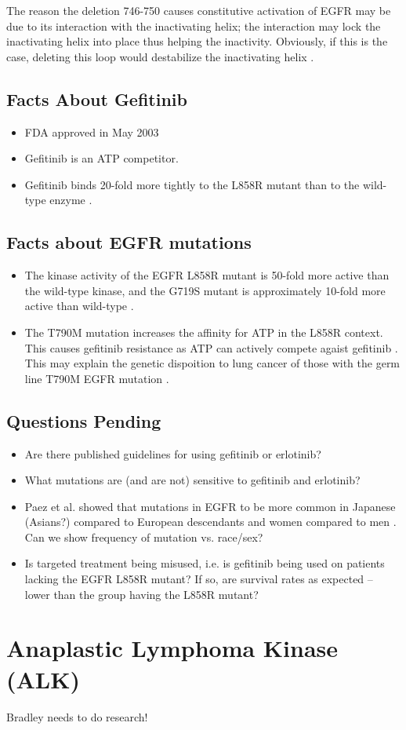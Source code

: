 \documentclass[12pt]{article}
\begin{document}
The reason the deletion 746-750 causes constitutive activation of EGFR may be due to its interaction with the inactivating helix; the interaction may lock the inactivating helix into place thus helping the inactivity. Obviously, if this is the case, deleting this loop would destabilize the inactivating helix  \cite{Zhang2006}.

\subsection*{Facts About Gefitinib}
\begin{itemize}
  \item FDA approved in May 2003
  \item Gefitinib is an ATP competitor. 
  \item Gefitinib binds 20-fold more tightly to the L858R mutant than to the wild-type enzyme \cite{Yun2007}.
\end{itemize}

\subsection*{Facts about EGFR mutations}
\begin{itemize}
  \item The kinase activity of the EGFR L858R mutant is 50-fold more active than the wild-type kinase, and the G719S mutant is approximately 10-fold more active than wild-type \cite{Yun2007}.
  \item The T790M mutation increases the affinity for ATP in the L858R context. This causes gefitinib resistance as ATP can actively compete agaist gefitinib \cite{Yun2008}. This may explain the genetic dispoition to lung cancer of those with the germ line T790M EGFR mutation \cite{Bell2005}.
\end{itemize}

\subsection*{Questions Pending}
\begin{itemize}
  \item Are there published guidelines for using gefitinib or erlotinib?
  \item What mutations are (and are not) sensitive to gefitinib and erlotinib?
  \item Paez et al. showed that mutations in EGFR to be more common in Japanese (Asians?) compared to European descendants and women compared to men \cite{Paez2004}. Can we show frequency of mutation vs. race/sex?
  \item Is targeted treatment being misused, i.e. is gefitinib being used on patients lacking the EGFR  L858R mutant? If so, are survival rates as expected -- lower than the group having the L858R mutant?
\end{itemize}

\section{Anaplastic Lymphoma Kinase (ALK)}
Bradley needs to do research!

\newpage


\end{document}
